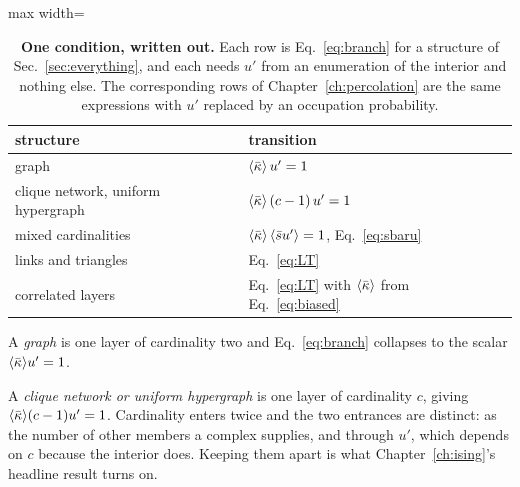 \begin{table}[b]
\centering\small
\begin{adjustbox}{max width=\linewidth}
\begin{tabular}{ll}
\hline\hline
structure & transition\\
\hline
graph & $\langle \bar\kappa \rangle\,u'=1$\\[2pt]
clique network, uniform hypergraph & $\langle \bar\kappa \rangle\,(c-1)\,u'=1$\\[2pt]
mixed cardinalities & $\langle \bar\kappa \rangle\,\langle \bar s u' \rangle=1$, Eq.~\eqref{eq:sbaru}\\[2pt]
links and triangles & Eq.~\eqref{eq:LT}\\[2pt]
correlated layers & Eq.~\eqref{eq:LT} with $\langle \bar\kappa \rangle$ from Eq.~\eqref{eq:biased}\\
\hline\hline
\end{tabular}
\end{adjustbox}
\caption{\textbf{One condition, written out.} Each row is
Eq.~\eqref{eq:branch} for a structure of Sec.~\ref{sec:everything}, and each
needs $u'$ from an enumeration of the interior and nothing else. The
corresponding rows of Chapter~\ref{ch:percolation} are the same expressions
with $u'$ replaced by an occupation probability.}
\label{tab:structures}
\end{table}

A \emph{graph} is one layer of cardinality two and Eq.~\eqref{eq:branch}
collapses to the scalar $\langle \bar\kappa \rangle u'=1$.

A \emph{clique network or uniform hypergraph} is one layer of cardinality $c$,
giving $\langle \bar\kappa \rangle(c-1)u'=1$. Cardinality enters twice and the two entrances
are distinct: as the number of other members a complex supplies, and through
$u'$, which depends on $c$ because the interior does. Keeping them apart is
what Chapter~\ref{ch:ising}'s headline result turns on.

